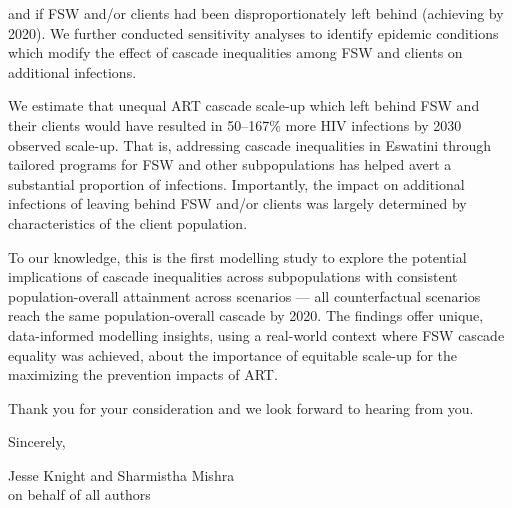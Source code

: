 and if FSW and/or clients had been disproportionately left behind (achieving \caslo by 2020).
We further conducted sensitivity analyses to identify epidemic conditions which modify
the effect of cascade inequalities among FSW and clients on additional infections.
\par
We estimate that unequal ART cascade scale-up which left behind FSW and their clients
would have resulted in 50--167\% more HIV infections by 2030 \vs observed scale-up.
That is, addressing cascade inequalities in Eswatini
through tailored programs for FSW and other subpopulations
has helped avert a substantial proportion of infections.
Importantly, the impact on additional infections of
leaving behind FSW and/or clients was largely determined by
characteristics of the client population.
\par\pagebreak %
To our knowledge, this is the first modelling study to explore
the potential implications of cascade inequalities across subpopulations
with consistent population-overall attainment across scenarios ---
\ie all counterfactual scenarios reach the same population-overall cascade by 2020.
The findings offer unique, data-informed modelling insights,
using a real-world context where FSW cascade equality was achieved,
about the importance of equitable scale-up
for the maximizing the prevention impacts of ART.
\par
Thank you for your consideration and we look forward to hearing from you.
\medskip\par
Sincerely,
\par
Jesse Knight and Sharmistha Mishra\\
on behalf of all authors
